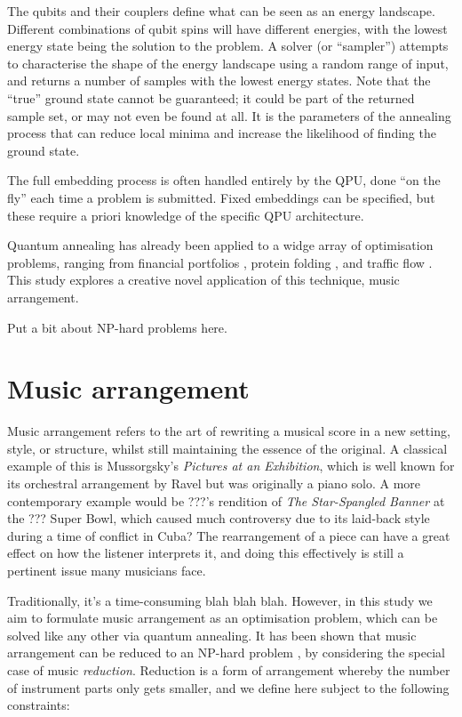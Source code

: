 \documentclass[12pt]{article}
\begin{document}
The qubits and their couplers define what can be seen as an energy landscape. Different combinations of qubit spins will have different energies, with the lowest energy state being the solution to the problem. A solver (or ``sampler'') attempts to characterise the shape of the energy landscape using a random range of input, and returns a number of samples with the lowest energy states. Note that the ``true'' ground state cannot be guaranteed; it could be part of the returned sample set, or may not even be found at all. It is the parameters of the annealing process that can reduce local minima and increase the likelihood of finding the ground state.

The full embedding process is often handled entirely by the QPU, done ``on the fly'' each time a problem is submitted. Fixed embeddings can be specified, but these require a priori knowledge of the specific QPU architecture.

Quantum annealing has already been applied to a widge array of optimisation problems, ranging from financial portfolios \cite{phillipson_portfolio_2021}, protein folding \cite{perdomo-ortiz_protein_2012}, and traffic flow \cite{inoue_traffic_2021}. This study explores a creative novel application of this technique, music arrangement.

Put a bit about NP-hard problems here.

\section{Music arrangement}

Music arrangement refers to the art of rewriting a musical score in a new setting, style, or structure, whilst still maintaining the essence of the original. A classical example of this is Mussorgsky's \emph{Pictures at an Exhibition}, which is well known for its orchestral arrangement by Ravel but was originally a piano solo. A more contemporary example would be ???'s rendition of \emph{The Star-Spangled Banner} at the ??? Super Bowl, which caused much controversy due to its laid-back style during a time of conflict in Cuba? The rearrangement of a piece can have a great effect on how the listener interprets it, and doing this effectively is still a pertinent issue many musicians face.

Traditionally, it's a time-consuming blah blah blah. However, in this study we aim to formulate music arrangement as an optimisation problem, which can be solved like any other via quantum annealing. It has been shown that music arrangement can be reduced to an NP-hard problem \cite{moses_computational_2016}, by considering the special case of music \emph{reduction}. Reduction is a form of arrangement whereby the number of instrument parts only gets smaller, and we define here subject to the following constraints:
\end{document}
